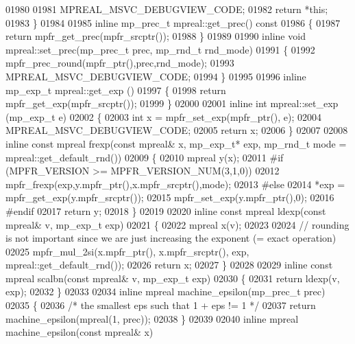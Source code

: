 \begin{DoxyCode}
{{01980 
01981     MPREAL\_MSVC\_DEBUGVIEW\_CODE;
01982     \textcolor{keywordflow}{return} *\textcolor{keyword}{this};
01983 \}
01984 
01985 \textcolor{keyword}{inline} mp\_prec\_t mpreal::get\_prec()\textcolor{keyword}{ const}
01986 \textcolor{keyword}{}\{
01987     \textcolor{keywordflow}{return} mpfr\_get\_prec(mpfr\_srcptr());
01988 \}
01989 
01990 \textcolor{keyword}{inline} \textcolor{keywordtype}{void} mpreal::set\_prec(mp\_prec\_t prec, mp\_rnd\_t rnd\_mode)
01991 \{
01992     mpfr\_prec\_round(mpfr\_ptr(),prec,rnd\_mode);
01993     MPREAL\_MSVC\_DEBUGVIEW\_CODE;
01994 \}
01995 
01996 \textcolor{keyword}{inline} mp\_exp\_t mpreal::get\_exp ()
01997 \{
01998     \textcolor{keywordflow}{return} mpfr\_get\_exp(mpfr\_srcptr());
01999 \}
02000 
02001 \textcolor{keyword}{inline} \textcolor{keywordtype}{int} mpreal::set\_exp (mp\_exp\_t e)
02002 \{
02003     \textcolor{keywordtype}{int} x = mpfr\_set\_exp(mpfr\_ptr(), e);
02004     MPREAL\_MSVC\_DEBUGVIEW\_CODE;
02005     \textcolor{keywordflow}{return} x;
02006 \}
02007 
02008 \textcolor{keyword}{inline} \textcolor{keyword}{const} mpreal frexp(\textcolor{keyword}{const} mpreal& x, mp\_exp\_t* exp, mp\_rnd\_t mode = mpreal::get\_default\_rnd())
02009 \{
02010     mpreal y(x);
02011 \textcolor{preprocessor}{#if (MPFR\_VERSION >= MPFR\_VERSION\_NUM(3,1,0))}
02012     mpfr\_frexp(exp,y.mpfr\_ptr(),x.mpfr\_srcptr(),mode);
02013 \textcolor{preprocessor}{#else}
02014     *exp = mpfr\_get\_exp(y.mpfr\_srcptr());
02015     mpfr\_set\_exp(y.mpfr\_ptr(),0);
02016 \textcolor{preprocessor}{#endif}
02017     \textcolor{keywordflow}{return} y;
02018 \}
02019 
02020 \textcolor{keyword}{inline} \textcolor{keyword}{const} mpreal ldexp(\textcolor{keyword}{const} mpreal& v, mp\_exp\_t exp)
02021 \{
02022     mpreal x(v);
02023 
02024     \textcolor{comment}{// rounding is not important since we are just increasing the exponent (= exact operation)}
02025     mpfr\_mul\_2si(x.mpfr\_ptr(), x.mpfr\_srcptr(), exp, mpreal::get\_default\_rnd());
02026     \textcolor{keywordflow}{return} x;
02027 \}
02028 
02029 \textcolor{keyword}{inline} \textcolor{keyword}{const} mpreal scalbn(\textcolor{keyword}{const} mpreal& v, mp\_exp\_t exp)
02030 \{
02031     \textcolor{keywordflow}{return} ldexp(v, exp);
02032 \}
02033 
02034 \textcolor{keyword}{inline} mpreal machine\_epsilon(mp\_prec\_t prec)
02035 \{
02036     \textcolor{comment}{/* the smallest eps such that 1 + eps != 1 */}
02037     \textcolor{keywordflow}{return} machine\_epsilon(mpreal(1, prec));
02038 \}
02039 
02040 \textcolor{keyword}{inline} mpreal machine\_epsilon(\textcolor{keyword}{const} mpreal& x)
}}
\end{DoxyCode}
